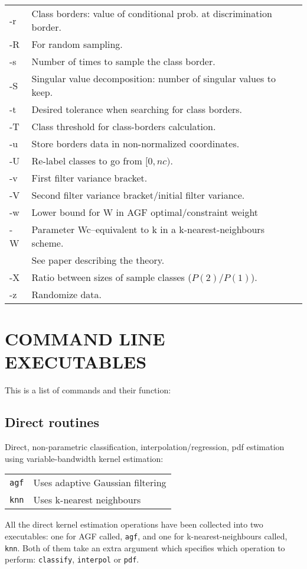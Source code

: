 \documentclass[12pt]{article}
\begin{document}
\begin{tabular}{ll}
-r & Class borders: value of conditional prob. at discrimination border.\\
-R & For random sampling.\\
-s & Number of times to sample the class border.\\
-S & Singular value decomposition: number of singular values to keep.\\
-t & Desired tolerance when searching for class borders.\\
-T & Class threshold for class-borders calculation.\\
-u & Store borders data in non-normalized coordinates.\\
-U & Re-label classes to go from $[0, nc)$.\\
-v & First filter variance bracket.\\
-V & Second filter variance bracket/initial filter variance.\\
-w & Lower bound for W in AGF optimal/constraint weight\\
-W & Parameter Wc--equivalent to k in a k-nearest-neighbours scheme.\\
  & See paper describing the theory.\\
-X & Ratio between sizes of sample classes ($P(2)/P(1)$).\\
-z & Randomize data.
\end{tabular}

\section{COMMAND LINE EXECUTABLES}

\label{COMMAND_LINE_EXECUTABLES}

This is a list of commands and their function:

\subsection{Direct routines}

Direct, non-parametric classification, interpolation/regression, pdf estimation using variable-bandwidth kernel estimation:

\begin{tabular}{ll}
\verb/agf/ & Uses adaptive Gaussian filtering\\
\verb/knn/ & Uses k-nearest neighbours
\end{tabular}

  All the direct kernel estimation operations have been collected into two executables: one for AGF called, \verb"agf", and one for k-nearest-neighbours called, \verb"knn".  Both of them take an extra argument which specifies which operation to perform: \verb"classify", \verb"interpol" or \verb"pdf".
\end{document}
